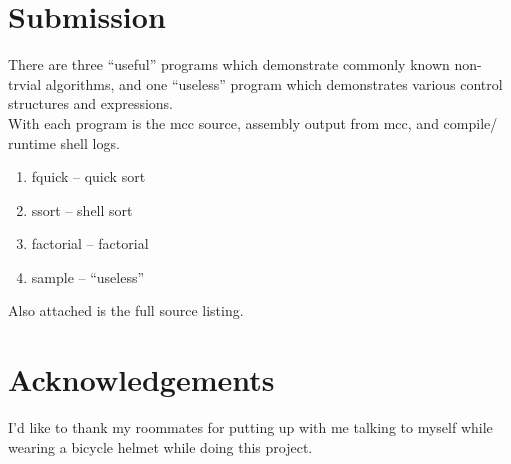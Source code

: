 \section{Submission}

There are three ``useful'' programs which demonstrate
commonly known non-trvial algorithms, and one ``useless'' program
which demonstrates various control structures and expressions. \\


With each program is the mcc source, assembly output from mcc,
and compile/ runtime shell logs.

\begin{enumerate}

\item fquick -- quick sort

\item ssort -- shell sort

\item factorial -- factorial 

\item sample -- ``useless''


\end{enumerate}
Also attached is the full source listing.

\section{Acknowledgements}

I'd like to thank my roommates for putting up with me talking
to myself while wearing a bicycle helmet while doing this project.



